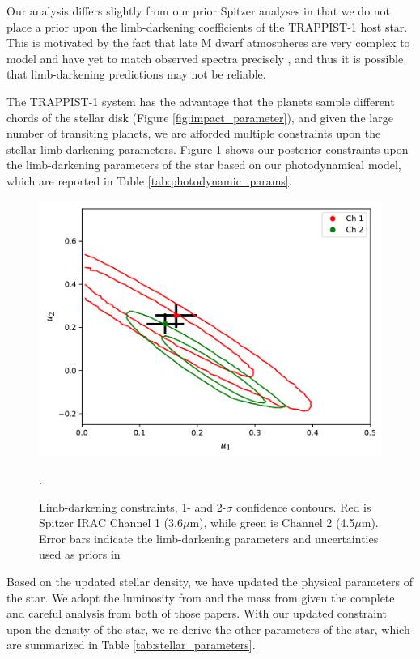 \documentclass[twocolumn]{aastex63}
\begin{document}
Our analysis differs slightly from our prior Spitzer analyses \citep{Delrez2018a,Ducrot2020} in that we do not place a prior upon the limb-darkening coefficients of the TRAPPIST-1 host star.  This is motivated by the fact that late M dwarf atmospheres are very complex to model and have yet to match observed spectra precisely \citep{Allard2011,Allard2012,Juncher2017}, and thus it is possible that limb-darkening predictions may not be reliable.

The TRAPPIST-1 system has the advantage that the planets sample different chords of the stellar disk (Figure \ref{fig:impact_parameter}), and given the large number of transiting planets, we are afforded multiple constraints upon the stellar limb-darkening parameters.  Figure \ref{fig:limb_darkening} shows our posterior constraints upon the limb-darkening parameters of the star based on our photodynamical model, which are reported in Table \ref{tab:photodynamic_params}.

\begin{figure}
    \centering
    \includegraphics[width=\hsize]{figures/limb_darkening_nouprior.pdf}
    \caption{Limb-darkening constraints, 1- and 2-$\sigma$ confidence contours.  Red is Spitzer IRAC Channel 1 (3.6$\mu$m), while green is Channel 2 (4.5$\mu$m).  Error bars indicate the limb-darkening parameters and uncertainties used as priors in \citet{Ducrot2020}}.
    \label{fig:limb_darkening}
\end{figure}

Based on the updated stellar density, we have updated the physical
parameters of the star.  We adopt the luminosity from \citet{Ducrot2020}
and the mass from \citet{Mann2019} given the complete and careful analysis
from both of those papers.  With our updated constraint upon the density
of the star, we re-derive the other parameters of the star, which are summarized in Table \ref{tab:stellar_parameters}.
\end{document}
